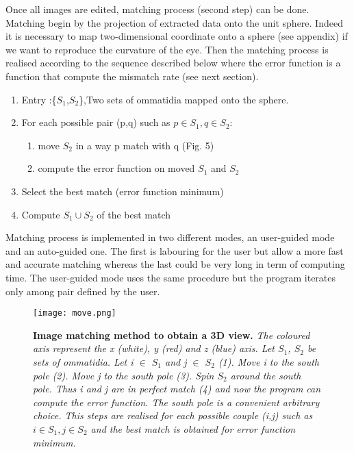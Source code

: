 \documentclass{article}
\begin{document}
Once all images are edited, matching process (second step) can be done. Matching begin by the projection of extracted data onto the unit sphere. Indeed it is necessary to map two-dimensional coordinate onto a sphere (see appendix) if we want to reproduce the curvature of the eye. Then the matching process is realised according to the sequence described below where the error function is a function that compute the mismatch rate (see next section).
\begin{enumerate}
		\item{Entry :\{$S_{1}$,$S_{2}$\},Two sets of ommatidia mapped onto the sphere.}
		\item{For each possible pair {(p,q) such as $p\in S_{1},q\in S_{2}$}: }
			\begin{enumerate}
			\item{move $S_{2}$ in a way p match with q (Fig. 5)}
			\item{compute the error function on moved $S_{1}$ and $S_{2}$}
			\end{enumerate}
		\item{Select the best match (error function minimum)}
		\item{Compute $S_{1}\cup S_{2}$ of the best match}
	\end{enumerate}

Matching process is implemented in two different modes, an user-guided mode and an auto-guided
one. The first is labouring for the user but allow a more fast and accurate
matching whereas the last could be very long in term of computing time. The user-guided mode uses the same procedure but the program iterates only among pair defined by the user.

\begin{figure}[H]
	  \centering
  	\texttt{[image: move.png]}
  	\caption{\textbf{Image matching method to obtain a 3D view.} \textsl{The coloured axis represent the x (white), y (red) and z (blue) axis. Let $S_{1}$, $S_{2}$ be sets of ommatidia.
  	 Let i $\in$ $S_{1}$ and j $\in$ $S_{2}$ (1).
		Move i to the south pole (2).
		Move j to the south pole (3).
		Spin $S_{2}$ around the south pole.
		Thus i and j are in perfect match (4) and now the program can compute the error function. 
		The south pole is a convenient arbitrary choice.
		This steps are realised for each possible couple {(i,j) such as $i\in S_{1},j\in S_{2}$} and the best match is obtained for error function minimum.
		}}
	\end{figure}
\end{document}
